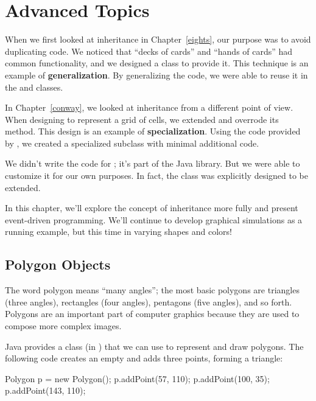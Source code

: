 \chapter{Advanced Topics}


When we first looked at inheritance in Chapter~\ref{eights}, our purpose was to avoid duplicating code.
We noticed that ``decks of cards'' and ``hands of cards'' had common functionality, and we designed a  class to provide it.
This technique is an example of {\bf generalization}.
By generalizing the code, we were able to reuse it in the  and  classes.


In Chapter~\ref{conway}, we looked at inheritance from a different point of view.
When designing  to represent a grid of cells, we extended  and overrode its  method.
This design is an example of {\bf specialization}.
Using the code provided by , we created a specialized subclass with minimal additional code.

We didn't write the code for ; it's part of the Java library.
But we were able to customize it for our own purposes.
In fact, the  class was explicitly designed to be extended.

In this chapter, we'll explore the concept of inheritance more fully and present event-driven programming.
We'll continue to develop graphical simulations as a running example, but this time in varying shapes and colors!


\section{Polygon Objects}

The word polygon means ``many angles''; the most basic polygons are triangles (three angles), rectangles (four angles), pentagons (five angles), and so forth.
Polygons are an important part of computer graphics because they are used to compose more complex images.

Java provides a  class (in ) that we can use to represent and draw polygons.
The following code creates an empty  and adds three points, forming a triangle:

\begin{code}
Polygon p = new Polygon();
p.addPoint(57, 110);
p.addPoint(100, 35);
p.addPoint(143, 110);
\end{code}

